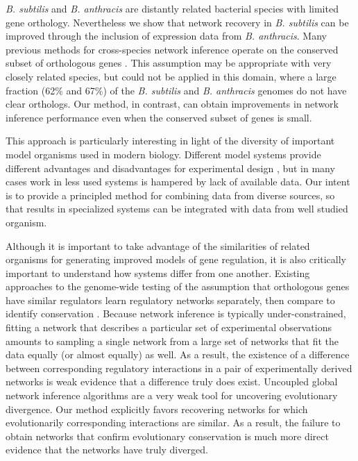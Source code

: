 \documentclass[11pt]{article}
\begin{document}
\textit{B. subtilis} and \textit{B. anthracis} are distantly related bacterial species with limited gene orthology. Nevertheless we show that network recovery in \textit{B. subtilis} can be improved through the inclusion of expression data from \textit{B. anthracis}. Many previous methods for cross-species network inference operate on the conserved subset of orthologous genes \cite{dillman_comparative_2015}. This assumption may be appropriate with very closely related species, but could not be applied in this domain, where a large fraction (62\% and 67\%) of the \textit{B. subtilis} and \textit{B. anthracis} genomes do not have clear orthologs. Our method, in contrast, can obtain improvements in network inference performance even when the conserved subset of genes is small.

This approach is particularly interesting in light of the diversity of important model organisms used in modern biology. Different model systems provide different advantages and disadvantages for experimental design \cite{stolfi_genetic_2012}, but in many cases work in less used systems is hampered by lack of available data. Our intent is to provide a principled method for combining data from diverse sources, so that results in specialized systems can be integrated with data from well studied organism.

Although it is important to take advantage of the similarities of related organisms for generating improved models of gene regulation, it is also critically important to understand how systems differ from one another. Existing approaches to the genome-wide testing of the assumption that orthologous genes have similar regulators learn regulatory networks separately, then compare to identify conservation \cite{aytes_cross-species_2014}. 
Because network inference is typically under-constrained, fitting a network that describes a particular set of experimental observations amounts to sampling a single network from a large set of networks that fit the data equally (or almost equally) as well. As a result, the existence of a difference between corresponding regulatory interactions in a pair of experimentally derived networks is weak evidence that a difference truly does exist. 
Uncoupled global network inference algorithms are a very weak tool for uncovering evolutionary divergence. 
Our method explicitly favors recovering networks for which evolutionarily corresponding interactions are similar. 
As a result, the failure to obtain networks that confirm evolutionary conservation is much more direct evidence that the networks have truly diverged. 
\end{document}
